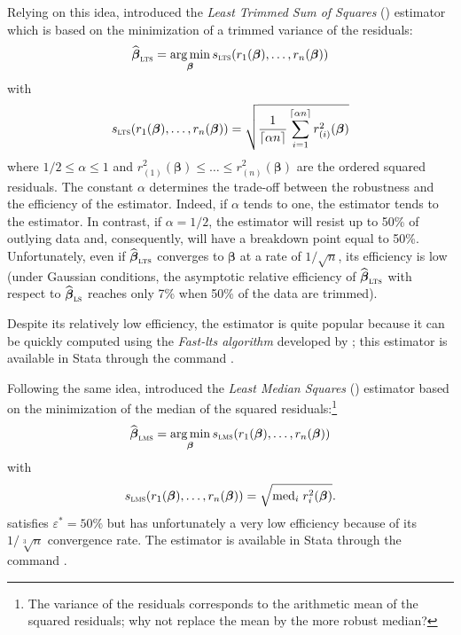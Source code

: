 Relying on this idea, \citet{Rousseeuw:1983} introduced the \emph{Least Trimmed
Sum of Squares} () estimator which is based on the minimization of a
trimmed variance of the residuals:
\[
    \sthat{\boldsymbol\beta}_{\stsc{LTS}}
     = \argmin_{\boldsymbol\beta}s_{\stsc{LTS}}(r_{1}(\boldsymbol\beta), \dots, r_{n}(\boldsymbol\beta))
\]
with
\[
    s_{\stsc{LTS}}(r_{1}(\boldsymbol\beta), \dots, r_{n}(\boldsymbol\beta))
    = \sqrt{\frac{1}{\lceil\alpha n\rceil} 
      \sum_{i=1}^{\lceil\alpha n\rceil}r_{(i)}^{2}(\boldsymbol\beta)}
\]
where $1/2 \leq \alpha \leq 1$ and $r_{(1)}^{2}(\boldsymbol\beta) \leq \dots
\leq r_{(n)}^{2}(\boldsymbol\beta)$ are the ordered squared residuals. The
constant $\alpha$ determines the trade-off between the robustness and the
efficiency of the estimator. Indeed, if $\alpha$ tends to one, the 
estimator tends to the  estimator. In contrast, if $\alpha = 1/2$, the
 estimator will resist up to 50\% of outlying data and, consequently,
will have a breakdown point equal to 50\%. Unfortunately, even if
$\sthat{\boldsymbol\beta}_{\stsc{LTS}}$ converges to $\boldsymbol\beta$ at a
rate of $1/\sqrt{n}$, its efficiency is low (under Gaussian conditions, the
asymptotic relative efficiency of $\sthat{\boldsymbol\beta}_{\stsc{LTS}}$ with
respect to $\sthat{\boldsymbol\beta}_{\stsc{LS}}$ reaches only 7\% when 50\% of
the data are trimmed).

Despite its relatively low efficiency, the  estimator is quite popular
because it can be quickly computed using the \emph{Fast-lts algorithm}
developed by \citet{rousseeuw&vdriessen99}; this estimator is available in
Stata through the command .

Following the same idea, \citet{rousseeuw:1984} introduced the \emph{Least Median
Squares} () estimator based on the minimization of the median of
the squared residuals:\footnote{The variance of the residuals corresponds to
the arithmetic mean of the squared residuals; why not replace the mean by the
more robust median?}
\[
    \sthat{\boldsymbol\beta}_{\stsc{LMS}} 
    = \argmin_{\boldsymbol\beta} s_{\stsc{LMS}}(r_{1}(\boldsymbol\beta), \dots, r_{n}(\boldsymbol\beta))
\]
with
\[
    s_{\stsc{LMS}}(r_{1}(\boldsymbol\beta), \dots, r_{n}(\boldsymbol\beta)) 
    = \sqrt{\mathrm{med}_{i}\;r_{i}^{2}(\boldsymbol\beta)}.
\]
 satisfies $\varepsilon^* = 50\%$ but has unfortunately a very low
efficiency because of its $1/\sqrt[3]{n}$ convergence rate. The 
estimator is available in Stata through the command .        

